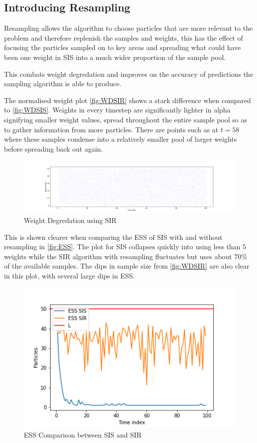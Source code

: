 \documentclass[sigconf]{acmart}
\begin{document}
\subsection{Introducing Resampling}
Resampling allows the algorithm to choose particles that are more relevant to the problem and therefore replenish the samples and weights, this has the effect of focusing the particles sampled on to key areas and spreading what could have been one weight in SIS into a much wider proportion of the sample pool.

This combats weight degredation and improves on the accuracy of predictions the sampling algorithm is able to produce.

The normalised weight plot \autoref{fig:WDSIR} shows a stark difference when compared to \autoref{fig:WDSIS}. Weights in every timestep are significantly lighter in alpha signifying smaller weight values, spread throughout the entire sample pool so as to gather information from more particles. There are points such as at $t=58$ where these samples condense into a relatively smaller pool of larger weights before spreading back out again. 
\begin{figure}[h]
  \centering
  \includegraphics[width=\linewidth]{../Part 1/DegPlotResample.png}
  \caption{Weight Degredation using SIR}
  \label{fig:WDSIR}
\end{figure}

This is shown clearer when comparing the ESS of SIS with and without resampling in \autoref{fig:ESS}. The plot for SIS collapses quickly into using less than 5 weights while the SIR algorithm with resampling fluctuates but uses about 70\% of the available samples. The dips in sample size from \autoref{fig:WDSIR} are also clear in this plot, with several large dips in ESS.
\begin{figure}[h]
  \centering
  \includegraphics[scale=0.65]{../Part 1/ESSComp.png}
  \caption{ESS Comparison between SIS and SIR}
  \label{fig:ESS}
\end{figure}
\end{document}

